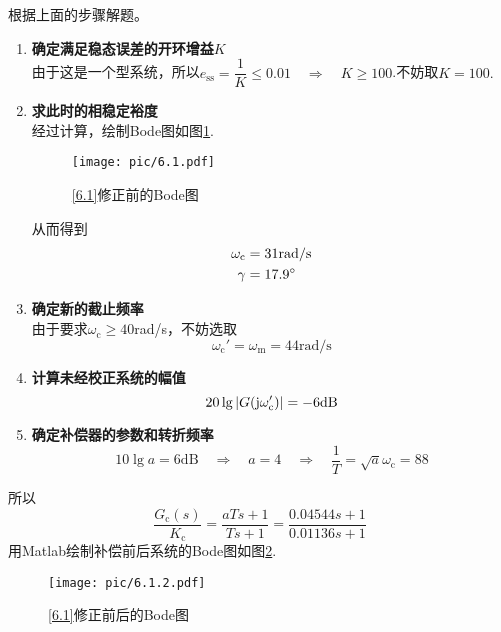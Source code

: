 \solve 根据上面的步骤解题。
\begin{enumerate}
	\item \textbf{确定满足稳态误差的开环增益$K$}\\
	由于这是一个\RMN[1]型系统，所以$e_{\text{ss}} = \dfrac{1}{K} \le 0.01 \quad \Rightarrow \quad K \ge 100$.不妨取$K = 100.$
	
	\item \textbf{求此时的相稳定裕度}\\
	经过计算，绘制Bode图如图\ref{F6.1.2}.
	\begin{figure}[!htb]
		\centering
		\texttt{[image: pic/6.1.pdf]}
		\vspace*{-1em}
		\caption{\ref{6.1}修正前的Bode图}
		\label{F6.1.2}
	\end{figure}

	从而得到
	\begin{align*}
		\omega_{\text{c}} &= 31 \text{rad/s}\\
		\gamma &= 17.9 {}^{\circ}
	\end{align*}
	
	\item \textbf{确定新的截止频率}\\
	由于要求$\omega_{\text{c}} \ge 40$rad/s，不妨选取
	\[
	\omega_{\text{c}}' = \omega_{\text{m}} = 44 \text{rad/s}
	\]
	
	\item \textbf{计算未经校正系统的幅值}
	\[
	20 \lg |G(\text{j} \omega_{\text{c}}')| = -6 \text{dB} 
	\]
	
	\item \textbf{确定补偿器的参数和转折频率}
	\[
	10 \lg a = 6 \text{dB} \quad \Rightarrow \quad a = 4 \quad \Rightarrow \quad \dfrac{1}{T} = \sqrt{a}\omega_{\text{c}} = 88
	\]
\end{enumerate}
所以
\[
\dfrac{G_\text{c}(s)}{K_\text{c}} = \dfrac{aTs + 1}{Ts + 1} = \dfrac{0.04544s + 1}{0.01136s + 1}
\]
用Matlab绘制补偿前后系统的Bode图如图\ref{F6.1.3}.
\begin{figure}[!htb]
	\centering
	\texttt{[image: pic/6.1.2.pdf]}
	\vspace*{-1em}
	\caption{\ref{6.1}修正前后的Bode图}
	\label{F6.1.3}
\end{figure}

